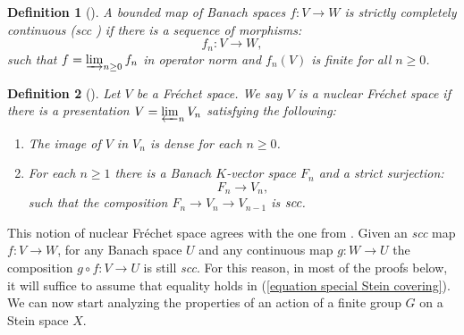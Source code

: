 \documentclass{amsart}
\newtheorem{defi}{ Definition}[subsection]
\begin{document}
\begin{defi}[{\cite[Definition 1.1]{kiehl analysis}}]
 A bounded map of Banach spaces $f:V\rightarrow W$ is strictly completely continuous (\emph{scc} ) if there is a sequence of morphisms:
 \begin{equation*}
     f_n:V\rightarrow W,
 \end{equation*}
such that $f=\varinjlim_{n\geq 0} f_n$ in operator norm and  $f_n(V)$ is finite for all $n\geq 0$.
\end{defi}
\begin{defi}[{\cite[Definition 5.3]{bode2021operations}}]
Let $V$ be a Fréchet space. We say $V$ is a nuclear Fréchet space if there is a presentation $V=\varprojlim_n V_n$ satisfying the following:
\begin{enumerate}[label=(\roman*)]
    \item The image of $V$ in $V_n$ is dense for each $n\geq 0$.
    \item For each $n\geq 1$ there is a Banach $K$-vector space $F_n$ and a strict surjection:
    \begin{equation*}
        F_n\rightarrow V_n,
    \end{equation*}
    such that the composition $F_n\rightarrow V_n\rightarrow V_{n-1}$ is $\emph{scc}$.
\end{enumerate}
\end{defi}
This notion of nuclear Fréchet space agrees with the one from \cite[Chapter IV]{schneider2013nonarchimedean}. Given an \emph{scc} map $f:V\rightarrow W$, for any Banach space $U$ and any continuous map $g:W\rightarrow U$ the composition $g\circ f:V\rightarrow U$ is still \emph{scc}. For this reason, in most of the proofs below, it will suffice to assume that equality holds in (\ref{equation special Stein covering}).
 We can now start analyzing the properties of an action of a finite group $G$ on a Stein space $X$. 
\end{document}

